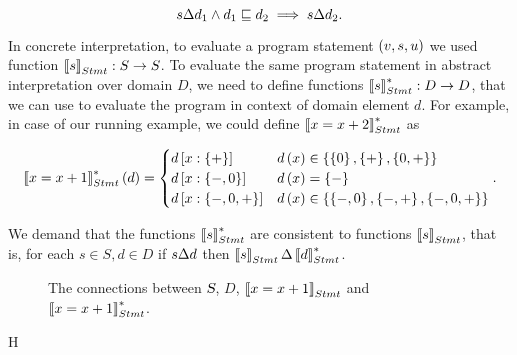 \documentclass[..thesis.tex]{subfiles}
\begin{document}
\begin{equation*}
s \Delta d_1 \land d_1 \sqsubseteq d_2 \implies s \Delta d_2 \text{.}
\end{equation*}

In concrete interpretation, to evaluate a program statement $\left( v, s, u \right)$ we used function $\left\llbracket s \right\rrbracket_{Stmt} : S \to S$. To evaluate the same program statement in abstract interpretation over domain $D$, we need to define functions $\left\llbracket s \right\rrbracket_{Stmt}^{*} : D \to D$, that we can use to evaluate the program in context of domain element $d$. For example, in case of our running example, we could define $\left\llbracket x =  x + 2 \right\rrbracket_{Stmt}^{*}$ as

\begin{equation*}
\left\llbracket x = x + 1 \right\rrbracket_{Stmt}^{*} \left( d \right) =
\begin{cases}
d \left[ x : \left\lbrace + \right\rbrace \right] & d \left( x \right)  \in \left\lbrace  \left\lbrace 0  \right\rbrace, \left\lbrace + \right\rbrace, \left\lbrace 0, + \right\rbrace \right\rbrace  \\
d \left[ x : \left\lbrace -, 0 \right\rbrace \right] & d \left( x \right) =  \left\lbrace - \right\rbrace \\
d \left[ x : \left\lbrace -, 0, + \right\rbrace \right] & d \left( x \right) \in \left\lbrace \left\lbrace -,0 \right\rbrace, \left\lbrace -, + \right\rbrace, \left\lbrace -, 0, + \right\rbrace \right\rbrace \\
\end{cases}
\text{.}      
\end{equation*}

We demand that the functions $\left\llbracket s \right\rrbracket_{Stmt}^{*}$ are consistent to functions $\left\llbracket s \right\rrbracket_{Stmt}$, that is, for each $s \in S, d \in D$ if $s \Delta d$ then $ \left\llbracket s \right\rrbracket_{Stmt} \Delta \left\llbracket d \right\rrbracket_{Stmt}^{*}$.

\begin{figure}[H]
  \begin{centering}
  \end{centering}
  \caption{The connections between $\textsl{S}$, $D$, $\left\llbracket x = x +1  \right\rrbracket_{Stmt}$ and $\left\llbracket x = x + 1 \right\rrbracket_{Stmt}^{*}$.}
\end{figure}{H}
\end{document}
